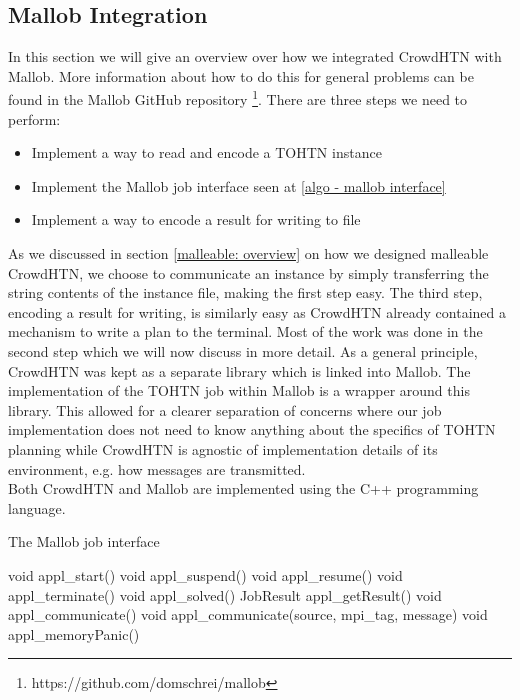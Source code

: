 \subsection{Mallob Integration}
\label{impl: mallob integration}
In this section we will give an overview over how we integrated CrowdHTN with Mallob. More information about how to do this for general problems can be found in the Mallob GitHub repository \footnote{https://github.com/domschrei/mallob}. There are three steps we need to perform:
\begin{itemize}
	\item Implement a way to read and encode a TOHTN instance
	\item Implement the Mallob job interface seen at \ref{algo - mallob interface}
	\item Implement a way to encode a result for writing to file
\end{itemize}
As we discussed in section \ref{malleable: overview} on how we designed malleable CrowdHTN, we choose to communicate an instance by simply transferring the string contents of the instance file, making the first step easy. The third step, encoding a result for writing, is similarly easy as CrowdHTN already contained a mechanism to write a plan to the terminal. Most of the work was done in the second step which we will now discuss in more detail. As a general principle, CrowdHTN was kept as a separate library which is linked into Mallob. The implementation of the TOHTN job within Mallob is a wrapper around this library. This allowed for a clearer separation of concerns where our job implementation does not need to know anything about the specifics of TOHTN planning while CrowdHTN is agnostic of implementation details of its environment, e.g. how messages are transmitted.\\
Both CrowdHTN and Mallob are implemented using the C++ programming language.
\begin{algorithm}
	\caption{The Mallob job interface}
	\label{algo - mallob interface}
	void appl\_start()\;
	void appl\_suspend()\;
	void appl\_resume()\;
	void appl\_terminate()\;
	void appl\_solved()\;
	JobResult appl\_getResult()\;
	void appl\_communicate()\;
	void appl\_communicate(source, mpi\_tag, message)\;
	void appl\_memoryPanic()\;
\end{algorithm}

